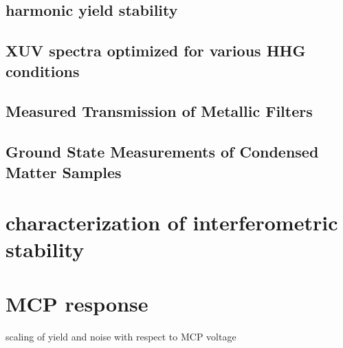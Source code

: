 \subsection{harmonic yield stability}

\subsection{XUV spectra optimized for various HHG conditions}

\subsection{Measured Transmission of Metallic Filters}

\subsection{Ground State Measurements of Condensed Matter Samples}

\section{characterization of interferometric stability}

\section{MCP response}

scaling of yield and noise with respect to MCP voltage